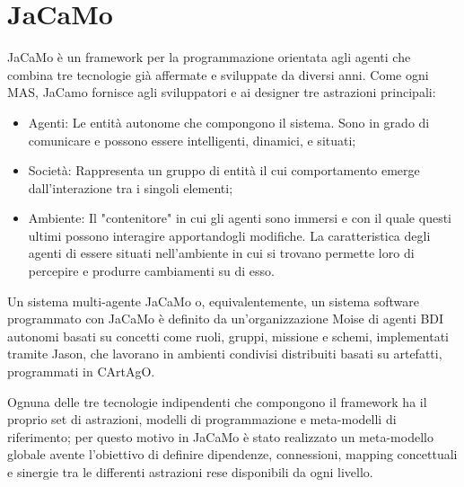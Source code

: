 \section{JaCaMo}

JaCaMo è un framework per la programmazione orientata agli agenti che combina tre tecnologie già affermate e sviluppate da diversi anni. Come ogni MAS, JaCamo fornisce agli sviluppatori e ai designer tre astrazioni principali:
\begin{itemize}
    \item Agenti: Le entità autonome che compongono il sistema. Sono in grado di comunicare e possono essere intelligenti, dinamici, e situati;
    \item Società: Rappresenta un gruppo di entità il cui comportamento emerge dall'interazione tra i singoli elementi;
    \item Ambiente: Il "contenitore" in cui gli agenti sono immersi e con il quale questi ultimi possono interagire apportandogli modifiche. La caratteristica degli agenti di essere situati nell'ambiente in cui si trovano permette loro di percepire e produrre cambiamenti su di esso.
\end{itemize}

Un sistema multi-agente JaCaMo o, equivalentemente, un sistema software programmato con JaCaMo è definito da un'organizzazione Moise di agenti BDI autonomi basati su concetti come ruoli, gruppi, missione e schemi, implementati tramite Jason, che lavorano in ambienti condivisi distribuiti basati su artefatti, programmati in CArtAgO.

\medskip

Ognuna delle tre tecnologie indipendenti che compongono il framework ha il proprio set di astrazioni, modelli di programmazione e meta-modelli di riferimento; per questo motivo in JaCaMo è stato realizzato un meta-modello globale avente l'obiettivo di definire dipendenze, connessioni, mapping concettuali e sinergie tra le differenti astrazioni rese disponibili da ogni livello.\cite{BOISSIER2013747}

